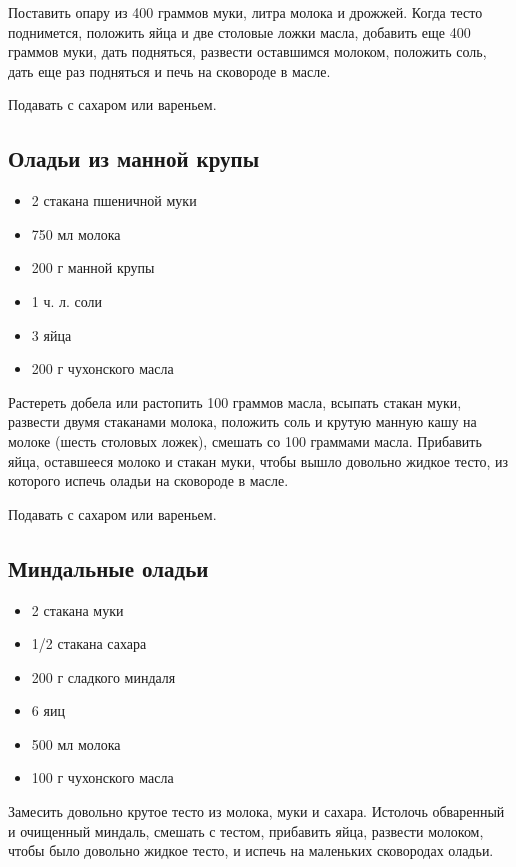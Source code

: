 Поставить опару из 400 граммов муки, литра молока и дрожжей. Когда тесто поднимется, положить яйца и две столовые ложки масла, добавить еще 400 граммов муки, дать подняться, развести оставшимся молоком, положить соль, дать еще раз подняться и печь на сковороде в масле.

Подавать с сахаром или вареньем.

\subsection{Оладьи из манной крупы}

\begin{itemize}
	\item 2 стакана пшеничной муки
    \item 750 мл молока
    \item 200 г манной крупы
    \item 1 ч. л. соли
    \item 3 яйца
    \item 200 г чухонского масла
\end{itemize}

Растереть добела или растопить 100 граммов масла, всыпать стакан муки, развести двумя стаканами молока, положить соль и крутую манную кашу на молоке (шесть столовых ложек), смешать со 100 граммами масла. Прибавить яйца, оставшееся молоко и стакан муки, чтобы вышло довольно жидкое тесто, из которого испечь оладьи на сковороде в масле.

Подавать с сахаром или вареньем.

\subsection{Миндальные оладьи}

\begin{itemize}
	\item 2 стакана муки
    \item 1/2 стакана сахара
    \item 200 г сладкого миндаля 
    \item 6 яиц 
    \item 500 мл молока
    \item 100 г чухонского масла
\end{itemize}

Замесить довольно крутое тесто из молока, муки и сахара. Истолочь обваренный и очищенный миндаль, смешать с тестом, прибавить яйца, развести молоком, чтобы было довольно жидкое тесто, и испечь на маленьких сковородах оладьи.

